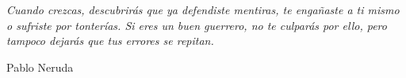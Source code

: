 

\vspace*{\fill}
\begin{changemargin}{5cm}{0.1cm}
{\sf \large \em \raggedleft
Cuando crezcas, descubrirás que ya defendiste mentiras,
te engañaste a ti mismo o sufriste por tonterías.
Si eres un buen guerrero, no te culparás por ello,
pero tampoco dejarás que tus errores se repitan.

Pablo Neruda
}
\end{changemargin}
\vspace*{\fill}


\newpage





